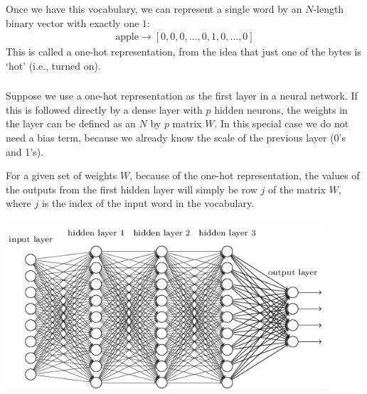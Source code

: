 \documentclass[xetex,mathserif,serif,aspectratio=169]{beamer}
\begin{document}
\begin{frame}[fragile] \frametitle{} \oldB \small


Once we have this vocabulary, we can represent a single word by
an $N$-length binary vector with exactly one $1$:
\begin{align*}
\text{apple} \rightarrow [0,0,0,\ldots,0,1,0,\ldots,0]
\end{align*}
This is called a one-hot representation, from the idea that just one of the
bytes is `hot' (i.e., turned on).

\end{frame}

\begin{frame}[fragile] \frametitle{} \oldB \small


Suppose we use a one-hot representation as the first layer in a neural
network. If this is followed directly by a dense layer with $p$ hidden
neurons, the weights in the layer can be defined as an $N$ by $p$ matrix
$W$. In this special case we do not need a bias term, because we already
know the scale of the previous layer (0's and 1's).

\pause For a given set of weights $W$, because of the one-hot representation, the
values of the outputs from the first hidden layer will simply be row $j$
of the matrix $W$, where $j$ is the index of the input word in the vocabulary.

\end{frame}

\begin{frame}[fragile] \frametitle{} \oldB \small

\begin{center}
\includegraphics[height=6cm]{img/tikz40.png}
\end{center}

\end{frame}
\end{document}
